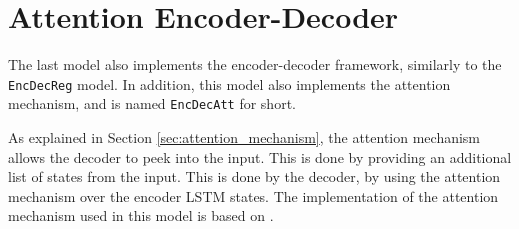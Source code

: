
\section{Attention Encoder-Decoder}
The last model also implements the encoder-decoder framework, similarly to the {\tt EncDecReg} model. In addition, this model also implements the attention mechanism, and is named {\tt EncDecAtt} for short.

As explained in Section \ref{sec:attention_mechanism}, the attention mechanism allows the decoder to peek into the input. This is done by providing an additional list of states from the input. This is done by the decoder, by using the attention mechanism over the encoder LSTM states. The implementation of the attention mechanism used in this model is based on \citep{vinyals2015grammar}.

